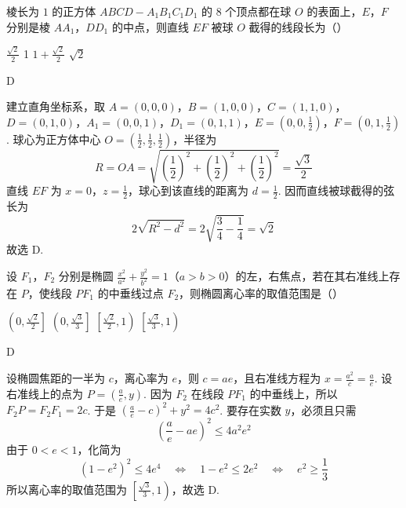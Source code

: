 \begin{problem}
棱长为 \(1\) 的正方体 \(ABCD - A_{1}B_{1}C_{1}D_{1}\) 的 \(8\) 个顶点都在球 \(O\) 的表面上，\(E\)，\(F\) 分别是棱 \(AA_{1}\)，\(DD_{1}\) 的中点，则直线 \(EF\) 被球 \(O\) 截得的线段长为（\quad）

\choices
    {\(\frac{\sqrt{2}}{2}\)}
    {1}
    {\(1 + \frac{\sqrt{2}}{2}\)}
    {\(\sqrt{2}\)}
\end{problem}

\begin{answer}
D
\end{answer}

\begin{solution}
建立直角坐标系，取 \(A=(0,0,0)\)，\(B=(1,0,0)\)，\(C=(1,1,0)\)，\(D=(0,1,0)\)，\(A_1=(0,0,1)\)，\(D_1=(0,1,1)\)，\(E=\left(0,0,\frac12\right)\)，\(F=\left(0,1,\frac12\right)\).
球心为正方体中心 \(O=(\frac12,\frac12,\frac12)\)，半径为
\[
R=OA=\sqrt{\left(\frac12\right)^2+\left(\frac12\right)^2+\left(\frac12\right)^2}=\frac{\sqrt3}{2}
\]
直线 \(EF\) 为 \(x=0\)，\(z=\frac12\)，球心到该直线的距离为 \(d=\frac12\). 因而直线被球截得的弦长为
\[
2\sqrt{R^2-d^2}=2\sqrt{\frac34-\frac14}=\sqrt2
\]
故选 D.
\end{solution}

\begin{problem}
设 \(F_{1}\)，\(F_{2}\) 分别是椭圆 \(\frac{x^{2}}{a^{2}} + \frac{y^{2}}{b^{2}} = 1\)（\(a > b > 0\)）的左，右焦点，若在其右准线上存在 \(P\)，使线段 \(PF_{1}\) 的中垂线过点 \(F_{2}\)，则椭圆离心率的取值范围是（\quad）

\choices
    {\(\left(0, \frac{\sqrt{2}}{2}\right]\)}
    {\(\left(0, \frac{\sqrt{3}}{3}\right]\)}
    {\(\left[\frac{\sqrt{2}}{2}, 1\right)\)}
    {\(\left[\frac{\sqrt{3}}{3}, 1\right)\)}
\end{problem}

\begin{answer}
D
\end{answer}

\begin{solution}
设椭圆焦距的一半为 \(c\)，离心率为 \(e\)，则 \(c=ae\)，且右准线方程为 \(x=\frac{a^2}{c}=\frac{a}{e}\). 设右准线上的点为 \(P=(\frac{a}{e},y)\). 因为 \(F_2\) 在线段 \(PF_1\) 的中垂线上，所以
\(F_2P=F_2F_1=2c\).
于是
\(\left(\frac{a}{e}-c\right)^2+y^2=4c^2\).
要存在实数 \(y\)，必须且只需
\[
\left(\frac{a}{e}-ae\right)^2\leqslant4a^2e^2
\]
由于 \(0<e<1\)，化简为
\[
(1-e^2)^2\leqslant4e^4\quad\Longleftrightarrow\quad1-e^2\leqslant2e^2\quad\Longleftrightarrow\quad e^2\geqslant\frac13
\]
所以离心率的取值范围为 \(\left[\frac{\sqrt3}{3},1\right)\)，故选 D.
\end{solution}

